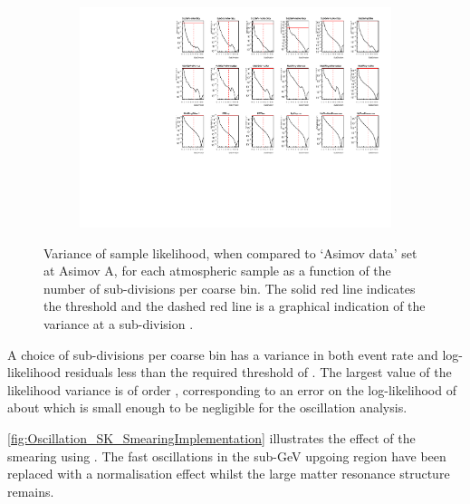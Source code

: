 \begin{figure}
  \begin{subfigure}[t]{\textwidth}
    \includegraphics[width=\textwidth, trim={0mm 0mm 0mm 0mm}, clip,page=1]{Figures/Oscillation/Likelihood_VarianceGraphs.pdf}
  \end{subfigure}
  \caption{Variance of sample likelihood, when compared to `Asimov data' set at Asimov A, for each atmospheric sample as a function of the number of sub-divisions per coarse bin. The solid red line indicates the  threshold and the dashed red line is a graphical indication of the variance at a sub-division .}
  \label{fig:Oscillation_SK_LLHVariance}
\end{figure}

A choice of  sub-divisions per coarse bin has a variance in both event rate and log-likelihood residuals less than the required threshold of . The largest value of the likelihood variance is of order , corresponding to an error on the log-likelihood of about  which is small enough to be negligible for the oscillation analysis.

\autoref{fig:Oscillation_SK_SmearingImplementation} illustrates the effect of the smearing using . The fast oscillations in the sub-GeV upgoing region have been replaced with a normalisation effect whilst the large matter resonance structure remains.

